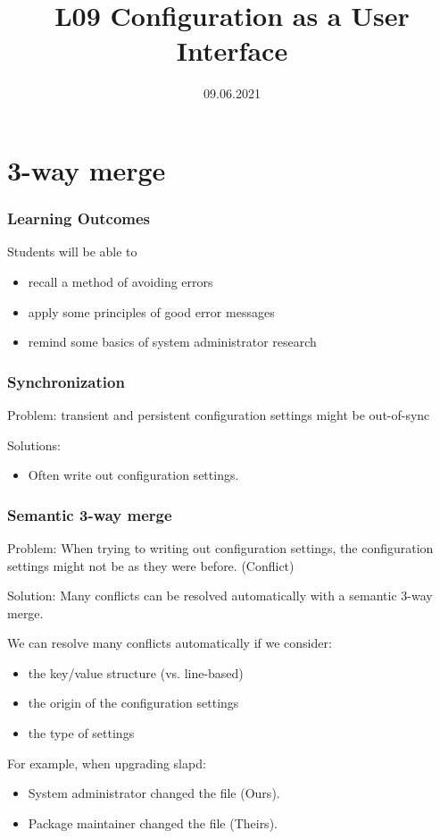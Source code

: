 

\title{L09 Configuration as a User Interface}
\date{09.06.2021}




\section{3-way merge}


\begin{frame}
	\frametitle{Learning Outcomes}
	Students will be able to
	\begin{itemize}
	\item recall a method of avoiding errors
	\item apply some principles of good error messages
	\item remind some basics of system administrator research
	\end{itemize}
\end{frame}


\begin{frame}
	\frametitle{Synchronization}

	Problem: transient and persistent configuration settings might be out-of-sync~\cite{jin2014configurations}

	\pause


	\pause

	Solutions:
	\begin{itemize}
	\item Often write out configuration settings.
	\end{itemize}
\end{frame}

\begin{frame}
	\frametitle{Semantic 3-way merge}

	Problem: When trying to writing out configuration settings, the configuration settings might not be as they were before. (Conflict)

	\pause

	Solution: Many conflicts can be resolved automatically with a semantic 3-way merge.

	\pause

	We can resolve many conflicts automatically if we consider:
	\begin{itemize}[<+-| alert@+>]
	\item the key/value structure (vs. line-based)
	\item the origin of the configuration settings
	\item the type of settings
	\end{itemize}

	\pause[\thebeamerpauses]

	For example, when upgrading slapd:
	\begin{itemize}
	\item System administrator changed the file (Ours).
	\item Package maintainer changed the file (Theirs).
	\end{itemize}
\end{frame}

